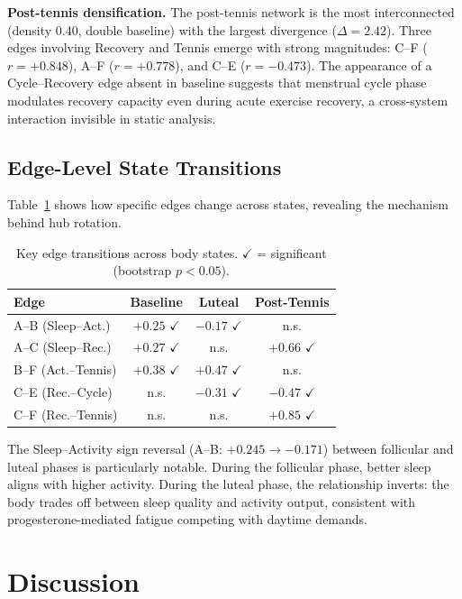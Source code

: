 \documentclass[letterpaper]{article}
\begin{document}
\textbf{Post-tennis densification.} The post-tennis network is the most interconnected (density 0.40, double baseline) with the largest divergence ($\Delta = 2.42$). Three edges involving Recovery and Tennis emerge with strong magnitudes: C--F ($r = +0.848$), A--F ($r = +0.778$), and C--E ($r = -0.473$). The appearance of a Cycle--Recovery edge absent in baseline suggests that menstrual cycle phase modulates recovery capacity even during acute exercise recovery, a cross-system interaction invisible in static analysis.

\subsection{Edge-Level State Transitions}

Table~\ref{tab:edges} shows how specific edges change across states, revealing the mechanism behind hub rotation.

\begin{table}[t]
\caption{Key edge transitions across body states. $\checkmark$ = significant (bootstrap $p < 0.05$).}
\label{tab:edges}
\vskip 0.1in
\centering
\small
\begin{tabular}{@{}lccc@{}}
\toprule
Edge & Baseline & Luteal & Post-Tennis \\
\midrule
A--B (Sleep--Act.) & $+0.25$ $\checkmark$ & $-0.17$ $\checkmark$ & n.s. \\
A--C (Sleep--Rec.) & $+0.27$ $\checkmark$ & n.s. & $+0.66$ $\checkmark$ \\
B--F (Act.--Tennis) & $+0.38$ $\checkmark$ & $+0.47$ $\checkmark$ & n.s. \\
C--E (Rec.--Cycle) & n.s. & $-0.31$ $\checkmark$ & $-0.47$ $\checkmark$ \\
C--F (Rec.--Tennis) & n.s. & n.s. & $+0.85$ $\checkmark$ \\
\bottomrule
\end{tabular}
\end{table}

The Sleep--Activity sign reversal (A--B: $+0.245 \to -0.171$) between follicular and luteal phases is particularly notable. During the follicular phase, better sleep aligns with higher activity. During the luteal phase, the relationship inverts: the body trades off between sleep quality and activity output, consistent with progesterone-mediated fatigue competing with daytime demands.

\section{Discussion}
\end{document}
